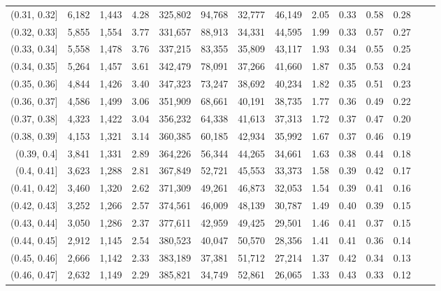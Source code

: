 \begin{tabular}{rrrrrrrrrrrrrr}
(0.31, 0.32]   &   6,182 &  1,443 &    4.28 &  325,802 &   94,768 &  32,777 &  46,149 &  2.05 &  0.33 &  0.58 &      0.28 \\
(0.32, 0.33]   &   5,855 &  1,554 &    3.77 &  331,657 &   88,913 &  34,331 &  44,595 &  1.99 &  0.33 &  0.57 &      0.27 \\
(0.33, 0.34]   &   5,558 &  1,478 &    3.76 &  337,215 &   83,355 &  35,809 &  43,117 &  1.93 &  0.34 &  0.55 &      0.25 \\
(0.34, 0.35]   &   5,264 &  1,457 &    3.61 &  342,479 &   78,091 &  37,266 &  41,660 &  1.87 &  0.35 &  0.53 &      0.24 \\
(0.35, 0.36]   &   4,844 &  1,426 &    3.40 &  347,323 &   73,247 &  38,692 &  40,234 &  1.82 &  0.35 &  0.51 &      0.23 \\
(0.36, 0.37]   &   4,586 &  1,499 &    3.06 &  351,909 &   68,661 &  40,191 &  38,735 &  1.77 &  0.36 &  0.49 &      0.22 \\
(0.37, 0.38]   &   4,323 &  1,422 &    3.04 &  356,232 &   64,338 &  41,613 &  37,313 &  1.72 &  0.37 &  0.47 &      0.20 \\
(0.38, 0.39]   &   4,153 &  1,321 &    3.14 &  360,385 &   60,185 &  42,934 &  35,992 &  1.67 &  0.37 &  0.46 &      0.19 \\
(0.39, 0.4]    &   3,841 &  1,331 &    2.89 &  364,226 &   56,344 &  44,265 &  34,661 &  1.63 &  0.38 &  0.44 &      0.18 \\
(0.4, 0.41]    &   3,623 &  1,288 &    2.81 &  367,849 &   52,721 &  45,553 &  33,373 &  1.58 &  0.39 &  0.42 &      0.17 \\
(0.41, 0.42]   &   3,460 &  1,320 &    2.62 &  371,309 &   49,261 &  46,873 &  32,053 &  1.54 &  0.39 &  0.41 &      0.16 \\
(0.42, 0.43]   &   3,252 &  1,266 &    2.57 &  374,561 &   46,009 &  48,139 &  30,787 &  1.49 &  0.40 &  0.39 &      0.15 \\
(0.43, 0.44]   &   3,050 &  1,286 &    2.37 &  377,611 &   42,959 &  49,425 &  29,501 &  1.46 &  0.41 &  0.37 &      0.15 \\
(0.44, 0.45]   &   2,912 &  1,145 &    2.54 &  380,523 &   40,047 &  50,570 &  28,356 &  1.41 &  0.41 &  0.36 &      0.14 \\
(0.45, 0.46]   &   2,666 &  1,142 &    2.33 &  383,189 &   37,381 &  51,712 &  27,214 &  1.37 &  0.42 &  0.34 &      0.13 \\
(0.46, 0.47]   &   2,632 &  1,149 &    2.29 &  385,821 &   34,749 &  52,861 &  26,065 &  1.33 &  0.43 &  0.33 &      0.12 \\

\end{tabular}
